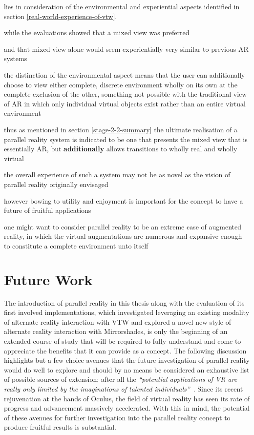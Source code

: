 lies in consideration of the environmental and experiential aspects identified in section \ref{real-world-experience-of-vtw}.

while the evaluations showed that a mixed view was preferred

and that mixed view alone would seem experientially very similar to previous AR systems

the distinction of the environmental aspect means that the user can additionally choose to view either complete, discrete environment wholly on its own at the complete exclusion of the other, something not possible with the traditional view of AR in which only individual virtual objects exist rather than an entire virtual environment


thus as mentioned in section \ref{stage-2-2-summary} the ultimate realisation of a parallel reality system is indicated to be one that presents the mixed view that is essentially AR, but \textbf{additionally} allows transitions to wholly real and wholly virtual

the overall experience of such a system may not be as novel as the vision of parallel reality originally envisaged

however bowing to utility and enjoyment is important for the concept to have a future of fruitful applications



one might want to consider parallel reality to be an extreme case of augmented reality, in which the virtual augmentations are numerous and expansive enough to constitute a complete environment unto itself







\section{Future Work}

The introduction of parallel reality in this thesis along with the evaluation of its first involved implementations, which investigated leveraging an existing modality of alternate reality interaction with VTW and explored a novel new style of alternate reality interaction with Mirrorshades, is only the beginning of an extended course of study that will be required to fully understand and come to appreciate the benefits that it can provide as a concept. The following discussion highlights but a few choice avenues that the future investigation of parallel reality would do well to explore and should by no means be considered an exhaustive list of possible sources of extension; after all the \textit{``potential applications of VR are really only limited by the imaginations of talented individuals''}~\cite{Giuseppe2014a}. Since its recent rejuvenation at the hands of Oculus, the field of virtual reality has seen its rate of progress and advancement massively accelerated. With this in mind, the potential of these avenues for further investigation into the parallel reality concept to produce fruitful results is substantial.

